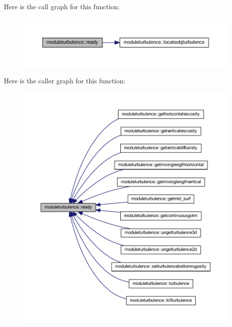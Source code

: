 Here is the call graph for this function\+:\nopagebreak
\begin{figure}[H]
\begin{center}
\leavevmode
\includegraphics[width=350pt]{namespacemoduleturbulence_aee156286cd0fad2976b9e8c3c1d52ec6_cgraph}
\end{center}
\end{figure}
Here is the caller graph for this function\+:\nopagebreak
\begin{figure}[H]
\begin{center}
\leavevmode
\includegraphics[width=350pt]{namespacemoduleturbulence_aee156286cd0fad2976b9e8c3c1d52ec6_icgraph}
\end{center}
\end{figure}
\mbox{\label{namespacemoduleturbulence_aaa0e2c6e1a9ea1d07cb81974aeb2b1f8}} 
